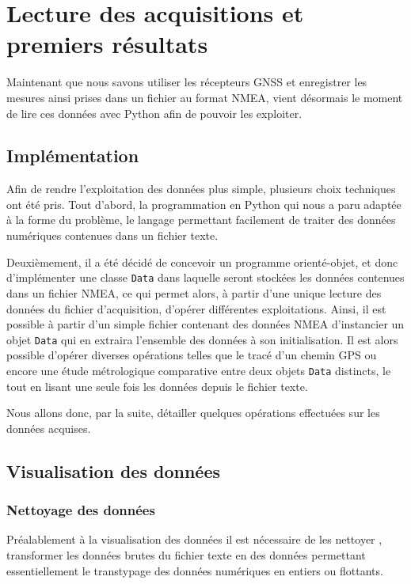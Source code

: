 \section{Lecture des acquisitions et premiers résultats}\label{sec:lecture-des-acquisitions-et-premiers-resultats}
   Maintenant que nous savons utiliser les récepteurs GNSS et enregistrer les mesures ainsi prises dans un fichier au format NMEA, vient désormais le moment de lire ces données avec Python afin de pouvoir les exploiter.

   \subsection{Implémentation}\label{subsec:implementation}
      Afin de rendre l'exploitation des données plus simple, plusieurs choix techniques ont été pris.
      Tout d'abord, la programmation en Python qui nous a paru adaptée à la forme du problème, le langage permettant facilement de traiter des données numériques contenues dans un fichier texte.

      Deuxièmement, il a été décidé de concevoir un programme orienté-objet, et donc d'implémenter une classe \texttt{Data} dans laquelle seront stockées les données contenues dans un fichier NMEA, ce qui permet alors, à partir d'une unique lecture des données du fichier d'acquisition, d'opérer différentes exploitations.
      Ainsi, il est possible à partir d'un simple fichier contenant des données NMEA d'instancier un objet \texttt{Data} qui en extraira l'ensemble des données à son initialisation.
      Il est alors possible d'opérer diverses opérations telles que le tracé d'un chemin GPS ou encore une étude métrologique comparative entre deux objets \texttt{Data} distincts, le tout en lisant une seule fois les données depuis le fichier texte.

      Nous allons donc, par la suite, détailler quelques opérations effectuées sur les données acquises.

   \subsection{Visualisation des données}\label{subsec:visualisation-des-donnees}
      \subsubsection{Nettoyage des données}
         Préalablement à la visualisation des données il est nécessaire de les \og nettoyer \fg{}, \ie transformer les données brutes du fichier texte en des données permettant essentiellement le transtypage des données numériques en entiers ou flottants.

